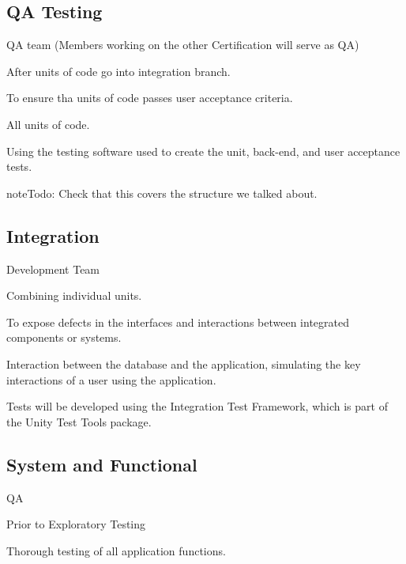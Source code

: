 \documentclass[letterpaper,10pt,english]{sphinxmanual}
\begin{document}
\subsection{QA Testing}
\label{\detokenize{test_plan/strategy:qa-testing}}
 QA team (Members working on the other Certification will serve as QA)

 After units of code go into integration branch.

 To ensure tha units of code passes user acceptance criteria.

 All units of code.

 Using the testing software used to create the unit, back-end, and user acceptance tests.

\begin{sphinxadmonition}{note}{\label{test_plan/strategy:index-1}Todo:}
Check that this covers the structure we talked about.
\end{sphinxadmonition}


\subsection{Integration}
\label{\detokenize{test_plan/strategy:integration}}
 Development Team

 Combining individual units.

 To expose defects in the interfaces and interactions between integrated components or systems.

 Interaction between the database and the application, simulating the key interactions of a user using the application.

 Tests will be developed using the Integration Test Framework, which is part of the Unity Test Tools package.


\subsection{System and Functional}
\label{\detokenize{test_plan/strategy:system-and-functional}}
 QA

 Prior to Exploratory Testing

 Thorough testing of all application functions.
\end{document}
